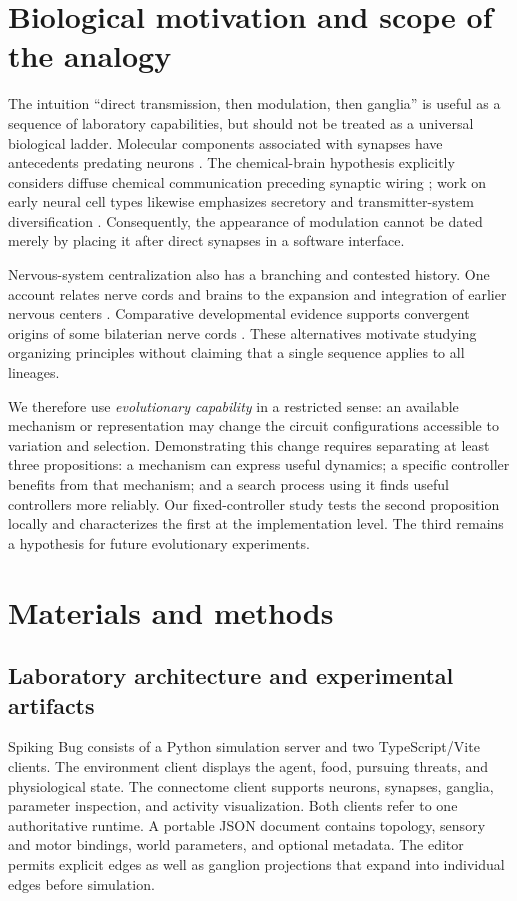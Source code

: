 \documentclass[11pt]{article}
\begin{document}
\section{Biological motivation and scope of the analogy}
The intuition ``direct transmission, then modulation, then ganglia'' is useful as a sequence of laboratory capabilities, but should not be treated as a universal biological ladder. Molecular components associated with synapses have antecedents predating neurons \citep{ryan2009}. The chemical-brain hypothesis explicitly considers diffuse chemical communication preceding synaptic wiring \citep{jekely2021}; work on early neural cell types likewise emphasizes secretory and transmitter-system diversification \citep{burkhardt2021}. Consequently, the appearance of modulation cannot be dated merely by placing it after direct synapses in a software interface.

Nervous-system centralization also has a branching and contested history. One account relates nerve cords and brains to the expansion and integration of earlier nervous centers \citep{arendt2016}. Comparative developmental evidence supports convergent origins of some bilaterian nerve cords \citep{martin2018}. These alternatives motivate studying organizing principles without claiming that a single sequence applies to all lineages.

We therefore use \emph{evolutionary capability} in a restricted sense: an available mechanism or representation may change the circuit configurations accessible to variation and selection. Demonstrating this change requires separating at least three propositions: a mechanism can express useful dynamics; a specific controller benefits from that mechanism; and a search process using it finds useful controllers more reliably. Our fixed-controller study tests the second proposition locally and characterizes the first at the implementation level. The third remains a hypothesis for future evolutionary experiments.

\section{Materials and methods}
\subsection{Laboratory architecture and experimental artifacts}
Spiking Bug consists of a Python simulation server and two TypeScript/Vite clients. The environment client displays the agent, food, pursuing threats, and physiological state. The connectome client supports neurons, synapses, ganglia, parameter inspection, and activity visualization. Both clients refer to one authoritative runtime. A portable JSON document contains topology, sensory and motor bindings, world parameters, and optional metadata. The editor permits explicit edges as well as ganglion projections that expand into individual edges before simulation.
\end{document}
